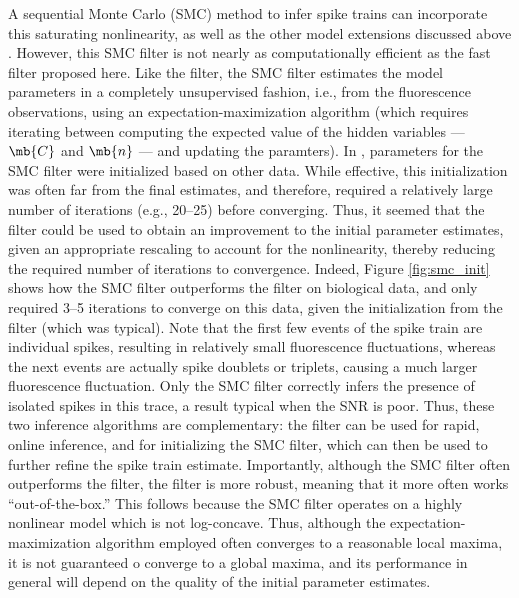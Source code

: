 A sequential Monte Carlo (SMC) method to infer spike trains can incorporate this saturating nonlinearity, as well as the other model extensions discussed above \cite{VogelsteinPaninski09} . However, this SMC filter is not nearly as computationally efficient as the fast filter proposed here.  Like the \foopsi filter, the SMC filter estimates the model parameters in a completely unsupervised fashion, i.e.,  from the fluorescence observations, using an expectation-maximization algorithm (which requires iterating between computing the expected value of the hidden variables --- $\mb{C}$ and $\mb{n}$ --- and updating the paramters).  In \cite{VogelsteinPaninski09}, parameters for the SMC filter were initialized based on other data.  While effective, this initialization was often far from the final estimates, and therefore, required a relatively large number of iterations (e.g., 20--25) before converging.  Thus, it seemed that the \foopsi filter could be used to obtain an improvement to the initial parameter estimates, given an appropriate rescaling to account for the nonlinearity, thereby reducing the required number of iterations to convergence.  Indeed, Figure \ref{fig:smc_init} shows how the SMC filter outperforms the \foopsi filter on biological data, and only required 3--5 iterations to converge on this data, given the initialization from the \foopsi filter (which was typical).  Note that the first few events of the spike train are individual spikes, resulting in relatively small fluorescence fluctuations, whereas the next events are actually spike doublets or triplets, causing a much larger fluorescence fluctuation.  Only the SMC filter correctly infers the presence of isolated spikes in this trace, a result typical when the SNR is poor.  Thus, these two inference algorithms are complementary: the \foopsi filter can be used for rapid, online inference, and for initializing the SMC filter, which can then be used to further refine the spike train estimate.  Importantly, although the SMC filter often outperforms the \foopsi filter, the \foopsi filter is more robust, meaning that it more often works ``out-of-the-box.''  This follows because the SMC filter operates on a highly nonlinear model which is not log-concave.  Thus, although the expectation-maximization algorithm employed often converges to a reasonable local maxima, it is not guaranteed o converge to a global maxima, and its performance in general will depend on the quality of the initial parameter estimates.  

